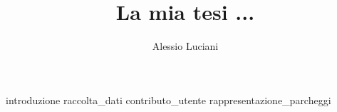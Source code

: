 \documentclass[binding=0.6cm,TFA]{sapthesis}
\title{La mia tesi ...} \author{Alessio Luciani}
\begin{document}
\frontmatter
\maketitle
\dedication{Alla mia famiglia}
\tableofcontents
\mainmatter
\Large
{introduzione}
{raccolta_dati}
{contributo_utente}
{rappresentazione_parcheggi}
\backmatter
\cleardoublepage
{} %
\end{document}
